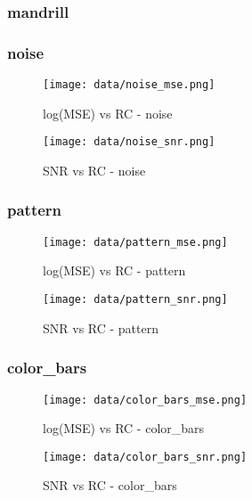 \documentclass[12pt,a4paper]{article}
\begin{document}
\subsubsection{mandrill}

\subsubsection{noise}
\begin{minipage}{0.5\textwidth}
        \centering
        \begin{figure}[H]
    \centering
    \texttt{[image: data/noise\_mse.png]}
    \caption{log(MSE) vs RC - noise}
    
\end{figure}
\end{minipage}\hfill
    \begin{minipage}{0.5\textwidth}
        \centering
        \begin{figure}[H]
    \centering
    \texttt{[image: data/noise\_snr.png]}
    \caption{SNR vs RC - noise}
    
\end{figure}
\end{minipage}
\subsubsection{pattern}
\begin{minipage}{0.5\textwidth}
        \centering
        \begin{figure}[H]
    \centering
    \texttt{[image: data/pattern\_mse.png]}
    \caption{log(MSE) vs RC - pattern}
    
\end{figure}
\end{minipage}\hfill
    \begin{minipage}{0.5\textwidth}
        \centering
        \begin{figure}[H]
    \centering
    \texttt{[image: data/pattern\_snr.png]}
    \caption{SNR vs RC - pattern}
    
\end{figure}
\end{minipage}
\subsubsection{color\_bars}
\begin{minipage}{0.5\textwidth}
        \centering
        \begin{figure}[H]
    \centering
    \texttt{[image: data/color\_bars\_mse.png]}
    \caption{log(MSE) vs RC - color\_bars}
    
\end{figure}
\end{minipage}\hfill
    \begin{minipage}{0.5\textwidth}
        \centering
        \begin{figure}[H]
    \centering
    \texttt{[image: data/color\_bars\_snr.png]}
    \caption{SNR vs RC - color\_bars}
    
\end{figure}
\end{minipage}
\end{document}
